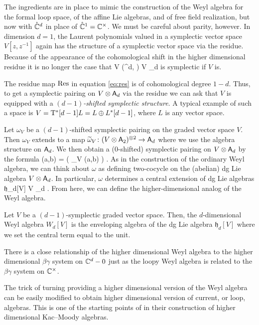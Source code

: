 \documentclass[11pt]{amsart}
\def\til{\Tilde}
\def\lie#1{\ensuremath{\mathfrak{#1}}}
\begin{document}
The ingredients are in place to mimic the construction of the Weyl algebra for the formal loop space, of the affine Lie algebras, and of free field realization, but now with $\mathring{\mathbb C}^d$ in place of $\mathring{\mathbb C}^1 = \mathbb C^\times$.
We must be careful about parity, however. 
In dimension $d = 1$, the Laurent polynomials valued in a symplectic vector space $V[z,z^{-1}]$ again has the structure of a symplectic vector space via the residue. 
Because of the appearance of the cohomological shift in the higher dimensional residue it is no longer the case that 
\beqn
V \otimes \RR\Gamma(\mathring{\DD}^d, \cO) \simeq V \otimes \sfA_d
\eeqn
is symplectic if $V$ is.

The residue map ${\rm Res}$ in equation \eqref{eq:res} is of cohomological degree $1-d$. 
Thus, to get a symplectic pairing on $V \otimes \mathsf A_d$ via the residue we can ask that $V$ is equipped with a {\em $(d-1)$-shifted symplectic structure}. 
A typical example of such a space is $V = {\rm T}^*[d-1] L = L \oplus L^*[d-1]$, where $L$ is any vector space.

Let $\omega_V$ be a $(d-1)$-shifted symplectic pairing on the graded vector space $V$. 
Then $\omega_V$ extends to a map $\til \omega_V \colon (V \otimes \sfA_2)^{\otimes 2} \to \sfA_d$ where we use the algebra structure on $\mathsf A_d$. 
We then obtain a ($0$-shifted) symplectic pairing on $V \otimes \mathsf A_d$ by the formula
\beqn
\label{eqn:omega}
\omega(a,b) = \Res ( \til \omega_V (a,b) ) .
\eeqn
As in the construction of the ordinary Weyl algebra, we can think about $\omega$ as defining two-cocycle on the (abelian) dg Lie algebra $V \otimes \mathsf A_d$.
In particular, $\omega$ determines a central extension of dg Lie algebras
\beqn
\CC \to \lie{h}_d[V] \to V \otimes \sfA_d .
\eeqn
From here, we can define the higher-dimensional analog of the Weyl algebra. 

\begin{dfn}
Let $V$ be a $(d-1)$-symplectic graded vector space. 
Then, the $d$-dimensional Weyl algebra $W_d[V]$ is the enveloping algebra of the dg Lie algebra $\lie{h}_d [V]$ where we set the central term equal to the unit.
\end{dfn}

There is a close relationship of the higher dimensional Weyl algebra to the higher dimensional $\beta\gamma$ system on $\mathbb C^d - 0$ just as the loopy Weyl algebra is related to the $\beta\gamma$ system on $\mathbb C^\times$. 

The trick of turning providing a higher dimensional version of the Weyl algebra can be easily modified to obtain higher dimensional version of current, or loop, algebras. 
This is one of the starting points of \cite{FHK} in their construction of higher dimensional Kac--Moody algebras. 
\end{document}
